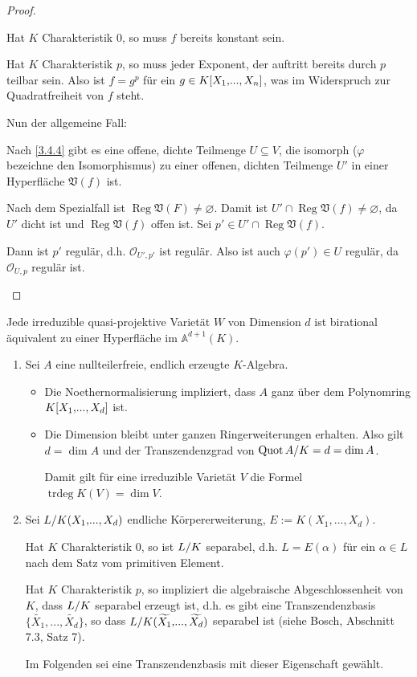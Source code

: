 \documentclass[a4paper,12pt,index=toc]{scrbook}
\theoremstyle{keinenummern} %
\def\A{\mathbb{A}}
\def\V{\mathfrak{V}}
\def\O{\mathcal{O}}
\newcommand{\Reg}{\operatorname{Reg}}
\newcommand{\trdeg}{\operatorname{trdeg}}
\renewcommand{\phi}{\varphi}
\newcommand{\leer}{\ensuremath{\varnothing}}
\newcommand{\Quot}{\operatorname{Quot}}
\renewcommand{\dotsc}{\ensuremath{\!...}}
\newcommand{\schlange}[1]{\widetilde{#1}}
\newcommand{\polyx}[1][n]{\ensuremath%
  [X_{1},\dotsc,X_{#1}]}
\begin{document}
\begin{proof}
\begin{enumerate}
Hat $K$ Charakteristik $0$, so muss $f$ bereits konstant sein.

Hat $K$ Charakteristik $p$, so muss jeder Exponent, der auftritt bereits durch $p$ teilbar sein. Also ist $f=g^p$ für ein $g\in K\polyx$, was im Widerspruch zur Quadratfreiheit von $f$ steht.

Nun der allgemeine Fall:

Nach \cref{3.4.4} gibt es eine offene, dichte Teilmenge $U\subseteq V$, die isomorph ($\phi$ bezeichne den Isomorphismus) zu einer offenen, dichten Teilmenge $U'$ in einer Hyperfläche $\V(f)$ ist.

Nach dem Spezialfall ist $\Reg \V(F)\neq \leer$. Damit ist $U'\cap \Reg \V(f)\neq \leer$, da $U'$ dicht ist und $\Reg \V(f)$ offen ist. Sei $p'\in U'\cap \Reg \V(f)$.

Dann ist $p'$ regulär, d.h. $\O_{U',p'}$ ist regulär. Also ist auch $\phi(p') \in U$ regulär, da $\O_{U,p}$ regulär ist.
  \end{enumerate}
\end{proof}
\begin{lem}\label{3.4.4} Jede irreduzible quasi-projektive Varietät $W$ von Dimension $d$ ist birational äquivalent zu einer Hyperfläche im $\A^{d+1}(K)$.
\end{lem}
\begin{nerinnerung} 
\begin{enumerate}
  \item Sei $A$ eine nullteilerfreie, endlich erzeugte $K$-Algebra.
  \begin{itemize}
       \item Die Noethernormalisierung impliziert, dass $A$ ganz über dem Polynomring $K\polyx[d]$ ist.
       \item Die Dimension bleibt unter ganzen Ringerweiterungen erhalten. Also gilt $d=\dim A$ und der Transzendenzgrad von $\Quotient{\Quot A}{K}=d=\dim A$.
 
       Damit gilt für eine irreduzible Varietät $V$ die Formel $\trdeg K(V)=\dim V$.
  \end{itemize}
   \item{} Sei $\Quotient{L}{K(X_1,\dotsc,X_d)}$ endliche Körpererweiterung, $E:=K(X_1,\dotsc,X_d)$.

Hat $K$ Charakteristik $0$, so ist $\Quotient{L}{K}$ separabel, d.h. $L=E(\alpha)$ für ein $\alpha \in L$ nach dem Satz vom primitiven Element.

Hat $K$ Charakteristik $p$, so impliziert die algebraische Abgeschlossenheit von $K$, dass $\Quotient{L}{K}$ separabel erzeugt ist, d.h. es gibt eine Transzendenzbasis $\{\schlange{X_1},\dotsc,\schlange{X_d}\}$, so dass $\Quotient{L}{K(\schlange{X_1},\dotsc,\schlange{X_d})}$ separabel ist (siehe Bosch, Abschnitt 7.3, Satz 7).

Im Folgenden sei eine Transzendenzbasis mit dieser Eigenschaft gewählt.

\end{enumerate}
\end{nerinnerung}
\end{document}
